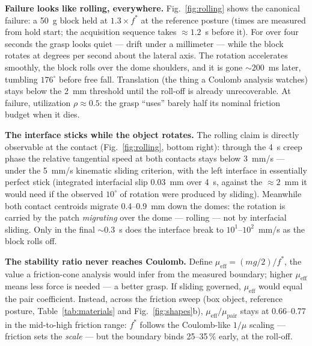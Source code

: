 \documentclass[journal]{IEEEtran}
\newcommand{\mueff}{\mu_{\mathrm{eff}}}
\newcommand{\mupair}{\mu_{\mathrm{pair}}}
\newcommand{\fstar}{f^{*}}
\begin{document}
\textbf{Failure looks like rolling, everywhere.} Fig.~\ref{fig:rolling}
shows the canonical failure: a 50~g block held at $1.3\times\fstar$ at the
reference posture (times are measured from hold start; the
acquisition sequence takes ${\approx}1.2$~s before it). For over four
seconds the grasp looks quiet --- drift under a millimeter --- while the
block rotates at degrees per second about the lateral axis. The rotation
accelerates smoothly, the block rolls over the dome shoulders, and it is
gone ${\sim}200$~ms later, tumbling $176^\circ$ before free fall.
Translation (the thing a Coulomb analysis watches) stays below the 2~mm
threshold until the roll-off is already unrecoverable. At failure,
utilization $\rho \approx 0.5$: the grasp ``uses'' barely half its nominal
friction budget when it dies.

\textbf{The interface sticks while the object rotates.} The rolling claim
is directly observable at the contact (Fig.~\ref{fig:rolling}, bottom
right): through the 4~s creep phase the relative tangential speed at both
contacts stays below 3~mm/s --- under the 5~mm/s kinematic sliding
criterion, with the left interface in essentially perfect stick
(integrated interfacial slip 0.03~mm over 4~s, against the
${\approx}2$~mm it would need if the observed $10^\circ$ of rotation
were produced by sliding). Meanwhile both contact centroids migrate
0.4--0.9~mm down the domes: the rotation is carried by the patch
\emph{migrating} over the dome --- rolling --- not by interfacial
sliding. Only in the final ${\sim}0.3$~s does the interface break to
$10^1$--$10^2$~mm/s as the block rolls off.

\textbf{The stability ratio never reaches Coulomb.} Define
$\mueff = (mg/2)/\fstar$, the value a friction-cone analysis would infer
from the measured boundary; higher $\mueff$ means less force is needed ---
a better grasp. If sliding governed, $\mueff$ would equal the pair
coefficient. Instead, across the friction sweep (box object, reference
posture, Table~\ref{tab:materials} and Fig.~\ref{fig:shapes}b),
$\mueff/\mupair$ stays at 0.66--0.77 in the mid-to-high friction range:
$\fstar$ follows the Coulomb-like $1/\mu$ scaling --- friction sets the
\emph{scale} --- but the boundary binds 25--35\,\% early, at the roll-off.
\end{document}
